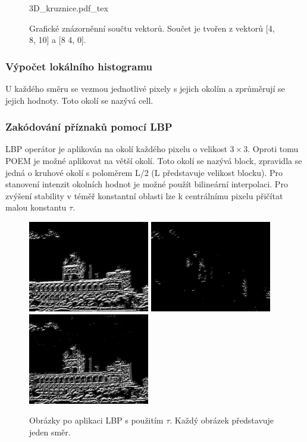 \documentclass[czech,BP]{thesiskiv}
\begin{document}
\begin{figure}[H]
    \centering
    \def\svgwidth{\columnwidth}
    {3D_kruznice.pdf_tex} 
    \caption{Grafické znázorněnní součtu vektorů. Součet je tvořen z vektorů [4, 8, 10] a [8 4, 0].}
\end{figure}

\subsubsection{Výpočet lokálního histogramu}
U každého směru  se vezmou jednotlivé pixely s jejich okolím a zprůměrují se jejich hodnoty. Toto okolí se nazývá cell. \\

\subsubsection{Zakódování příznaků pomocí LBP}
LBP operátor je aplikován na okolí každého pixelu o velikost $3 \times 3$. Oproti tomu POEM je možné aplikovat na větší okolí. Toto okolí se nazývá block, zpravidla se jedná o kruhové okolí s poloměrem L/2 (L představuje velikost blocku). Pro stanovení intenzit okolních hodnot je možné použít bilineární interpolaci. Pro zvýšení stability v téměř konstantní oblasti lze k centrálnímu pixelu přičítat malou konstantu $\tau$.

\begin{figure}[H]
	\centering
	\includegraphics[width=150pt]{./img/lbp_3_1.jpg}
	\includegraphics[width=150pt]{./img/lbp_3_2.jpg}
	\includegraphics[width=150pt]{./img/lbp_3_3.jpg}
	\caption{Obrázky po aplikaci LBP s použitím $\tau$. Každý obrázek představuje jeden směr.}
\end{figure}
\end{document}
